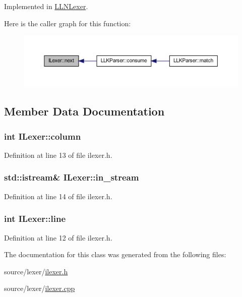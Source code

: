 Implemented in \hyperlink{class_l_l_n_lexer_a3832522afb32a85b3171f552ff9dd676}{LLNLexer}.



Here is the caller graph for this function:
\nopagebreak
\begin{figure}[H]
\begin{center}
\leavevmode
\includegraphics[width=400pt]{class_i_lexer_a6f5098fda43f68b01d2e7a2a7158c50d_icgraph}
\end{center}
\end{figure}




\subsection{Member Data Documentation}
\hypertarget{class_i_lexer_a05ce2bfa3595f992618d2a328b66bdfb}{
\subsubsection[{column}]{\setlength{\rightskip}{0pt plus 5cm}int {\bf ILexer::column}}}
\label{class_i_lexer_a05ce2bfa3595f992618d2a328b66bdfb}


Definition at line 13 of file ilexer.h.

\hypertarget{class_i_lexer_a02d418cc6fdcbfbf6cad7bf914cce77f}{
\subsubsection[{in\_\-stream}]{\setlength{\rightskip}{0pt plus 5cm}std::istream\& {\bf ILexer::in\_\-stream}}}
\label{class_i_lexer_a02d418cc6fdcbfbf6cad7bf914cce77f}


Definition at line 14 of file ilexer.h.

\hypertarget{class_i_lexer_a5d766f4f4dcc976553ab17a5753ef8ff}{
\subsubsection[{line}]{\setlength{\rightskip}{0pt plus 5cm}int {\bf ILexer::line}}}
\label{class_i_lexer_a5d766f4f4dcc976553ab17a5753ef8ff}


Definition at line 12 of file ilexer.h.



The documentation for this class was generated from the following files:\begin{DoxyCompactItemize}
\item 
source/lexer/\hyperlink{ilexer_8h}{ilexer.h}\item 
source/lexer/\hyperlink{ilexer_8cpp}{ilexer.cpp}\end{DoxyCompactItemize}

